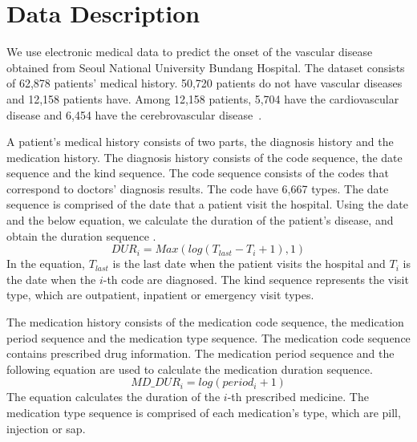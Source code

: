 \documentclass{article}
\newcommand{\todoc}[2]{{\textcolor{#1}{\textbf{[#2]}}}}
\newcommand{\todogreen}[1]{\todoc{green}{\textbf{#1}}}
\newcommand{\jwha}[1]{\todogreen{JW: #1}}
\begin{document}







\section{Data Description}
\label{Data}

We use electronic medical data to predict the onset of the vascular disease obtained from Seoul National University Bundang Hospital. The dataset consists of 62,878 patients' medical history. 50,720 patients do not have vascular diseases and 12,158 patients have. Among 12,158 patients, 5,704 have the cardiovascular disease and 6,454 have the cerebrovascular disease~\cite{ha2017predicting}.      
 
A patient's medical history consists of two parts, the diagnosis history and the medication history. 
The diagnosis history consists of the code sequence, the date sequence and the kind sequence. 
The code sequence consists of the codes that correspond to doctors' diagnosis results. The code have 6,667 types. 
The date sequence is comprised of the date that a patient visit the hospital. Using the date and the below equation, we calculate the duration of the patient's disease, and obtain the duration sequence .
\[ DUR_{i} = Max( log( T_{last} - T_{i} + 1 ), 1 ) \]
In the equation, $T_{last}$ is the last date when the patient visits the hospital and $T_{i}$ is the date when the $i$-th code are diagnosed. The kind sequence represents the visit type, which are outpatient, inpatient or emergency visit types. 

The medication history consists of the medication code sequence, the medication period sequence and the medication type sequence. 
The medication code sequence contains prescribed drug information.
The medication period sequence and the following equation are used to calculate the medication duration sequence. 
\[ MD\_DUR_{i} = log( period_{i} + 1 ) \]
The equation calculates the duration of the $i$-th prescribed medicine. The medication type sequence is comprised of each medication's type, which are pill, injection or sap. 
\end{document}
